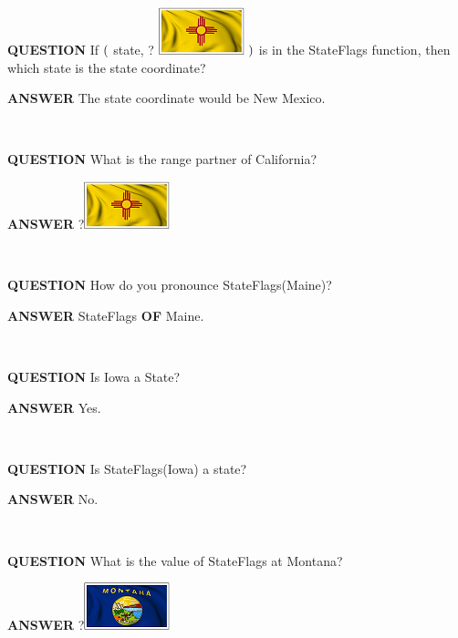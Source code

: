 \documentclass{ximera}
\begin{document}
\begin{dialogue}
\item [\textbf{QUESTION}] If  $\Large{(}$ state, ? \includegraphics{pics/StateFlags/NewMexico.png} $\Large{)}$  is in the StateFlags function, then which state is the state coordinate?
\item [\textbf{ANSWER}]  The state coordinate would be New Mexico.
\end{dialogue}
\quad \\

\begin{dialogue}
\item [\textbf{QUESTION}] What is the range partner of California?
\item [\textbf{ANSWER}]    ?\includegraphics{pics/StateFlags/NewMexico.png}
\end{dialogue}
\quad \\

\begin{dialogue}
\item [\textbf{QUESTION}] How do you pronounce StateFlags(Maine)?
\item [\textbf{ANSWER}]   StateFlags \textbf{OF} Maine.
\end{dialogue}
\quad \\

\begin{dialogue}
\item [\textbf{QUESTION}] Is Iowa a State?
\item [\textbf{ANSWER}]    Yes.
\end{dialogue}
\quad \\

\begin{dialogue}
\item [\textbf{QUESTION}] Is StateFlags(Iowa) a state?
\item [\textbf{ANSWER}]    No.
\end{dialogue}
\quad \\

\begin{dialogue}
\item [\textbf{QUESTION}] What is the value of StateFlags at Montana?
\item [\textbf{ANSWER}]   ?\includegraphics{pics/StateFlags/Montana.png}
\end{dialogue}
\quad \\
\end{document}
